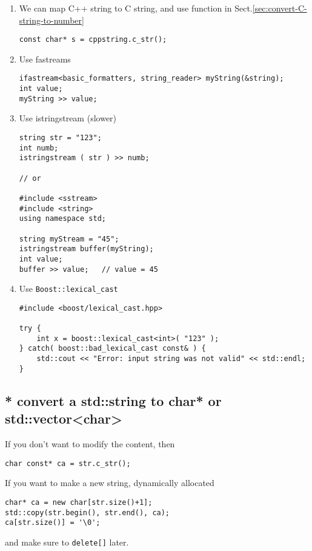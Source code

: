 \begin{enumerate}
  \item We can map C++ string to C string, and use function in Sect.\ref{sec:convert-C-string-to-number}
\begin{verbatim}
const char* s = cppstring.c_str();
\end{verbatim}
  
  \item Use fastreams
  
\begin{lstlisting}
ifastream<basic_formatters, string_reader> myString(&string);
int value;
myString >> value;
\end{lstlisting}

   \item Use istringstream (slower)
   
 \begin{lstlisting}
string str = "123";
int numb;
istringstream ( str ) >> numb;

// or	 
 
#include <sstream>
#include <string>
using namespace std;

string myStream = "45";
istringstream buffer(myString);
int value;
buffer >> value;   // value = 45 
 \end{lstlisting}
 
   \item Use \verb!Boost::lexical_cast!
 
\begin{lstlisting}
#include <boost/lexical_cast.hpp>

try {
    int x = boost::lexical_cast<int>( "123" );
} catch( boost::bad_lexical_cast const& ) {
    std::cout << "Error: input string was not valid" << std::endl;
}
\end{lstlisting}
\end{enumerate}


\subsection{* convert a std::string to char* or std::vector<char>}

If you don't want to modify the content, then 
\begin{verbatim}
char const* ca = str.c_str();
\end{verbatim}

If you want to make a new string, dynamically allocated
\begin{verbatim}
char* ca = new char[str.size()+1];
std::copy(str.begin(), str.end(), ca);
ca[str.size()] = '\0';
\end{verbatim}
and make sure to \verb!delete[]! later.

